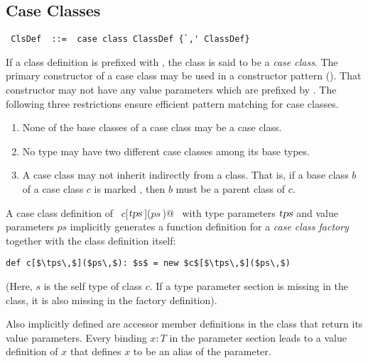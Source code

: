\documentclass[a4paper,12pt,twoside,titlepage]{book}
\newcommand{\tps}{\mbox{\sl tps}}
\begin{document}
\subsection{Case Classes}
\label{sec:case-classes}

\syntax\begin{lstlisting} ClsDef  ::=  case class ClassDef {`,' ClassDef}
\end{lstlisting}

If a class definition is prefixed with , the class is said
to be a {\em case class}.  The primary constructor of a case class may
be used in a constructor pattern ().  That
constructor may not have any value parameters which are prefixed by
.  The following three restrictions ensure efficient pattern
matching for case classes.
\begin{enumerate}
\item None of the base classes of a case class may be a case
class. 
\item No type may have two different case classes among its base types. 
\item A case class may not inherit indirectly from a
\lstinline@sealed@ class.  That is, if a base class $b$ of a case class $c$
is marked \lstinline@sealed@, then $b$ must be a parent class of $c$.
\end{enumerate}

A case class definition of ~\lstinline@$c$[$\tps\,$]($ps\,$)@~ with type
parameters $\tps$ and value parameters $ps$ implicitly
generates a function definition for a {\em case class factory}
together with the class definition itself:
\begin{lstlisting}
def c[$\tps\,$]($ps\,$): $s$ = new $c$[$\tps\,$]($ps\,$)
\end{lstlisting}
(Here, $s$ is the self type of class $c$. 
If a type parameter section
is missing in the class, it is also missing in the factory
definition).  

Also implicitly defined are accessor member definitions
in the class that return its value parameters. Every binding
$x: T$ in the parameter section leads to a value definition of
$x$ that defines $x$ to be an alias of the parameter.  
\end{document}
